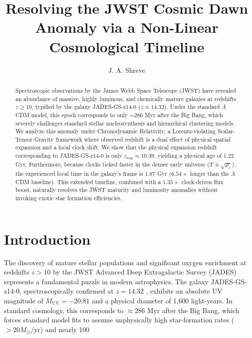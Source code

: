 \documentclass[twocolumn,tighten]{aastex701}
\begin{document}
\title{Resolving the JWST Cosmic Dawn Anomaly via a Non-Linear Cosmological Timeline}

\author[0000-0002-1234-5678]{J. A. Shreve}

\begin{abstract}
Spectroscopic observations by the James Webb Space Telescope (JWST) have revealed an abundance of massive, highly luminous, and chemically mature galaxies at redshifts $z \ge 10$, typified by the galaxy JADES-GS-z14-0 ($z \approx 14.32$). Under the standard $\Lambda$CDM model, this epoch corresponds to only $\sim 286$ Myr after the Big Bang, which severely challenges standard stellar nucleosynthesis and hierarchical clustering models. We analyze this anomaly under Chronodynamic Relativity, a Lorentz-violating Scalar-Tensor Gravity framework where observed redshift is a dual effect of physical spatial expansion and a local clock shift. We show that the physical expansion redshift corresponding to JADES-GS-z14-0 is only $z_{\text{exp}} \approx 10.39$, yielding a physical age of $1.22$ Gyr. Furthermore, because clocks ticked faster in the denser early universe ($T \propto \sqrt{\rho_s}$), the experienced local time in the galaxy's frame is $1.87$ Gyr ($6.54\times$ longer than the $\Lambda$CDM baseline). This extended timeline, combined with a $1.35\times$ clock-driven flux boost, naturally resolves the JWST maturity and luminosity anomalies without invoking exotic star formation efficiencies.
\end{abstract}


\section{Introduction}
The discovery of mature stellar populations and significant oxygen enrichment at redshifts $z > 10$ by the JWST Advanced Deep Extragalactic Survey (JADES) represents a fundamental puzzle in modern astrophysics. The galaxy JADES-GS-z14-0, spectroscopically confirmed at $z = 14.32$ \citep{carniani2024}, exhibits an absolute UV magnitude of $M_{\text{UV}} = -20.81$ and a physical diameter of 1,600 light-years. In standard cosmology, this corresponds to $\approx 286$ Myr after the Big Bang, which forces standard model fits to assume unphysically high star-formation rates ($>20 M_\odot/\text{yr}$) and nearly 100%
\end{document}

